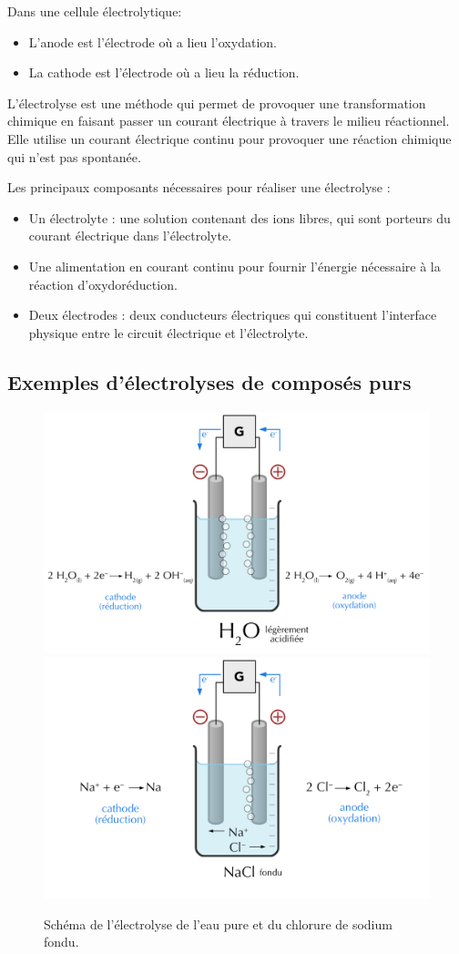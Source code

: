 \documentclass[
  11pt,
  a4paper,
  openany]{book}
\providecommand{\tightlist}{%
  \setlength{\itemsep}{0pt}\setlength{\parskip}{0pt}}
\begin{document}
Dans une cellule électrolytique:

\begin{itemize}
\tightlist
\item
  L'anode est l'électrode où a lieu l'oxydation.
\item
  La cathode est l'électrode où a lieu la réduction.
\end{itemize}

L'électrolyse est une méthode qui permet de provoquer une transformation chimique en faisant passer un courant électrique à travers le milieu réactionnel. Elle utilise un courant électrique continu pour provoquer une réaction chimique qui n'est pas spontanée.

Les principaux composants nécessaires pour réaliser une électrolyse :

\begin{itemize}
\tightlist
\item
  Un électrolyte : une solution contenant des ions libres, qui sont porteurs du courant électrique dans l'électrolyte.
\item
  Une alimentation en courant continu pour fournir l'énergie nécessaire à la réaction d'oxydoréduction.
\item
  Deux électrodes : deux conducteurs électriques qui constituent l'interface physique entre le circuit électrique et l'électrolyte.
\end{itemize}

\clearpage

\subsection{Exemples d'électrolyses de composés purs}\label{exemples-duxe9lectrolyses-de-composuxe9s-purs}

\begin{figure}

{\centering \includegraphics[width=0.49\linewidth]{images/electrolysis-water} \includegraphics[width=0.49\linewidth]{images/electrolysis-NaCl} 

}

\caption{Schéma de l'électrolyse de l'eau pure et du chlorure de sodium fondu.}\label{fig:electrolysis-water-NaCl}
\end{figure}
\end{document}
